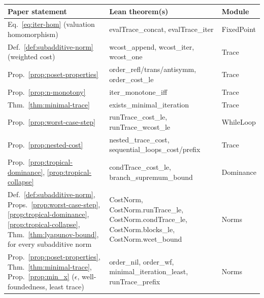 \documentclass[oneside,english]{amsart}
\numberwithin{equation}{section}
\numberwithin{figure}{section}
\theoremstyle{plain}
\theoremstyle{definition}
\theoremstyle{plain}
\theoremstyle{remark}
\theoremstyle{plain}
\theoremstyle{definition}
\theoremstyle{plain}
\theoremstyle{remark}
\newcommand{\lean}[1]{{\ttfamily\small #1}}
\begin{document}
\begin{table}[p]
\centering
\scriptsize
\setlength{\tabcolsep}{3pt}
\begin{tabular}{@{}>{\raggedright\arraybackslash}p{}>{\raggedright\arraybackslash}p{}>{\raggedright\arraybackslash}p{}@{}}
\toprule
Paper statement & Lean theorem(s) & Module \\
\midrule
Eq.~\eqref{eq:iter-hom} (valuation homomorphism) & \lean{evalTrace\_\allowbreak concat}, \lean{evalTrace\_\allowbreak iter} & \lean{FixedPoint} \\
Def.~\ref{def:subadditive-norm} (weighted cost) & \lean{wcost\_\allowbreak append}, \lean{wcost\_\allowbreak iter}, \lean{wcost\_\allowbreak one} & \lean{Trace} \\
Prop.~\ref{prop:poset-properties} & \lean{order\_\allowbreak refl/\allowbreak trans/\allowbreak antisymm}, \lean{order\_\allowbreak cost\_\allowbreak le} & \lean{Trace} \\
Prop.~\ref{prop:n-monotony} & \lean{iter\_\allowbreak monotone\_\allowbreak iff} & \lean{Trace} \\
Thm.~\ref{thm:minimal-trace} & \lean{exists\_\allowbreak minimal\_\allowbreak iteration} & \lean{Trace} \\
Prop.~\ref{prop:worst-case-step} & \lean{runTrace\_\allowbreak cost\_\allowbreak le}, \lean{runTrace\_\allowbreak wcost\_\allowbreak le} & \lean{WhileLoop} \\
Prop.~\ref{prop:nested-cost} & \lean{nested\_\allowbreak trace\_\allowbreak cost}, \lean{sequential\_\allowbreak loops\_\allowbreak cost/\allowbreak prefix} & \lean{Trace} \\
Prop.~\ref{prop:tropical-dominance}, \ref{prop:tropical-collapse} & \lean{condTrace\_\allowbreak cost\_\allowbreak le}, \lean{branch\_\allowbreak supremum\_\allowbreak bound} & \lean{Dominance} \\
Def.~\ref{def:subadditive-norm}, Props.~\ref{prop:worst-case-step}, \ref{prop:tropical-dominance}, \ref{prop:tropical-collapse}, Thm.~\ref{thm:lyapunov-bound}, for every subadditive norm & \lean{CostNorm}, \lean{CostNorm.\allowbreak runTrace\_\allowbreak le}, \lean{CostNorm.\allowbreak condTrace\_\allowbreak le}, \lean{CostNorm.\allowbreak blocks\_\allowbreak le}, \lean{CostNorm.\allowbreak wcet\_\allowbreak bound} & \lean{Norms} \\
Prop.~\ref{prop:poset-properties}, Thm.~\ref{thm:minimal-trace}, Prop.~\ref{prop:min_x} ($\epsilon$, well-foundedness, least trace) & \lean{order\_\allowbreak nil}, \lean{order\_\allowbreak wf}, \lean{minimal\_\allowbreak iteration\_\allowbreak least}, \lean{runTrace\_\allowbreak prefix} & \lean{Norms} \\

\end{tabular}
\end{table}
\end{document}

